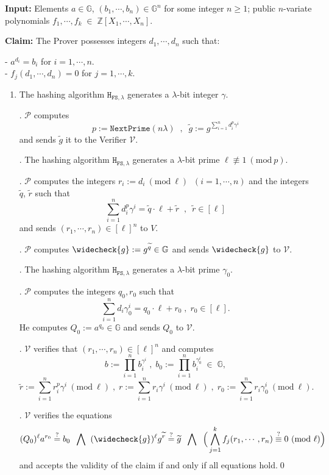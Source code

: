 \documentclass[11pt, lettersize, notitlepage, leqno, footskip=0.6cm]{article}
\newcommand{\bz}{\mathbb Z}
\newcommand{\pl}{\prod\limits}
\newcommand{\slim}{\sum\limits}
\newcommand{\ttt}{\texttt}
\newcommand{\bG}{\mathbb{G}}
\newcommand{\wti}{\widetilde}
\newcommand{\mc}{\mathcal}
\newcommand{\mb}{\mathbb}
\newcommand{\lam}{\lambda}
\newcommand{\weck}{\widecheck}
\newcommand{\mP}{\mc{P}}
\newcommand{\V}{\mc{V}}
\newcommand{\vs}{\vspace{-0.15cm}}
\newcommand{\noin}{\noindent}
\newcommand{\sta}{\stackrel{?}{=}}
\newcommand{\Mod}[1]{\ (\mathrm{mod}\ #1)}
\numberwithin{equation}{section}
\begin{document}
\noindent \textbf{Input:} Elements $a\in\mb{G} $, $(b_1,\cdots,b_n)\in \mb{G}^n$ for some integer $n\geq 1$; public $n$-variate polynomials $f_1,\cdots,f_k\;\in\; \bz[X_1,\cdots,X_n]$.

\noindent \textbf{Claim:} The Prover possesses integers $d_1,\cdots, d_n$ such that:

\noindent- $a^{d_i} = b_i$ for $i = 1,\cdots, n$.\\
- $f_j(d_1,\cdots,d_n) = 0$ for $j = 1,\cdots, k$.

\begin{enumerate}[wide, labelwidth=!, labelindent=0pt]\vs \item The hashing algorithm $\ttt{H}_{\ttt{FS},\lam}$ generates a $\lam$-bit integer $\gamma$.

. $\mc{P}$ computes \vs $$p:= \ttt{NextPrime}(n\lam)\;\;,\;\;\wti{g} :=g^{\sum\limits_{i=1}^n d_i^{p}\gamma^i}$$ and sends $\wti{g}$ it to the Verifier $\mc{V}$.

. The hashing algorithm $\ttt{H}_{\ttt{FS},\lam}$ generates a $\lam$-bit prime $\ell\not\equiv 1\Mod{p}$.
 
. $\mc{P}$ computes the integers $r_i:=d_i\Mod{\ell}\;\; (i=1,\cdots, n)$ and the integers $\wti{q}$, $\wti{r}$ such that \vs $$\slim_{i=1}^n d_i^{p}\gamma^i = \wti{q} \cdot \ell+\wti{r}\;\;,\:\;\wti{r}\in [\ell] $$ and sends $(r_1,\cdots,r_n)\in [\ell]^n$ to $V$.

\noin 5. $\mP$ computes $\weck{g}:= g^{\wti{q}}\in \bG$ and sends $\weck{g}$ to  $\V$. 

\noin 6. The hashing algorithm $\ttt{H}_{\ttt{FS},\lam}$ generates a $\lam$-bit prime $\gamma_{0}$.

\noin 7. $\mP$ computes the integers $q_0, r_0$ such that \vs $$\slim_{i=1}^n d_i\gamma_{0}^i = q_0 \cdot \ell+r_0\;,\;r_0\in[\ell] .$$ He computes $Q_0:= a^{q_{0}}\in \bG$ and sends $Q_0$ to $\V$.

. $\mc{V}$ verifies that $(r_1,\cdots,r_n)\in [\ell]^n$ and computes \vs $$b := \pl_{i=1}^n b_i^{\gamma^i}\;,\;b_0 := \pl_{i=1}^n b_i^{\gamma_{0}^i}\;\in \;\bG,$$ \vspace{-0.2cm} $$\wti{r}:= \slim_{i=1}^n r_i^{p}\gamma^i\Mod{\ell}\;,\;r:= \slim_{i=1}^n r_i\gamma^i\Mod{\ell}\;,\;r_0:=\slim_{i=1}^n r_i\gamma_{0}^i\Mod{\ell}.$$ 

. $\mc{V}$ verifies the equations \vs $$ (Q_0)^{\ell} a^{r_{0}} \sta b_0 \;\;\bigwedge\;\; (\weck{g})^{\ell}g^{\wti{r}} \stackrel{?}{=}\wti{g} \;\;\bigwedge\;\;\Big( \bigwedge\limits_{j=1}^k  f_j(r_1,\cdots,r_n) \stackrel{?}{\equiv} 0\Mod{\ell} \Big)$$ and accepts the validity of the claim if and only if all equations hold.\qed \end{enumerate}
\end{document}
